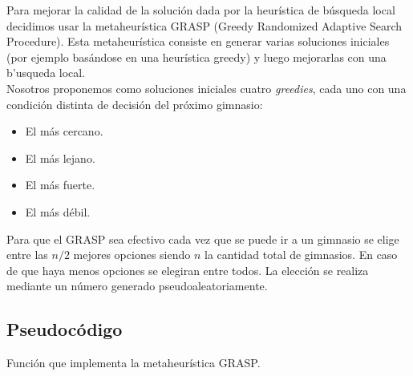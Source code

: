 Para mejorar la calidad de la soluci\'on dada por la heur\'istica de b\'usqueda local decidimos usar la metaheur\'istica GRASP (Greedy Randomized Adaptive Search Procedure). Esta metaheur\'istica consiste en generar varias soluciones iniciales (por ejemplo bas\'andose en una heur\'istica greedy) y luego mejorarlas con una b'usqueda local. \\
Nosotros proponemos como soluciones iniciales cuatro \emph{greedies}, cada uno con una condici\'on distinta de decisi\'on del pr\'oximo gimnasio:
\begin{itemize}
    \item El m\'as cercano.
    \item El m\'as lejano.
    \item El m\'as fuerte.
    \item El m\'as d\'ebil.
\end{itemize}

Para que el GRASP sea efectivo cada vez que se puede ir a un gimnasio se elige entre las $n/2$ mejores opciones siendo $n$ la cantidad total de gimnasios. En caso de que haya menos opciones se elegiran entre todos. La elecci\'on se realiza mediante un n\'umero generado pseudoaleatoriamente.

\subsection{Pseudoc\'odigo}

\SetAlgoLined
{}
\begin{algorithm}[H]
	\label{algo: ejercicio4_pseudocodigo}
	\caption{Función que implementa la metaheur\'istica GRASP.}
\end{algorithm}


